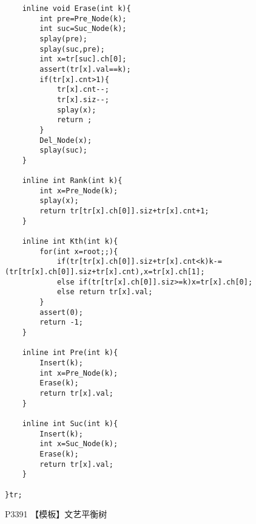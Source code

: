 \documentclass{ctexart}
\begin{document}
\begin{lstlisting}
	inline void Erase(int k){
		int pre=Pre_Node(k);
		int suc=Suc_Node(k);
		splay(pre);
		splay(suc,pre);
		int x=tr[suc].ch[0];
		assert(tr[x].val==k);
		if(tr[x].cnt>1){
			tr[x].cnt--;
			tr[x].siz--;
			splay(x);
			return ;
		}
		Del_Node(x);
		splay(suc);
	}
	
	inline int Rank(int k){
		int x=Pre_Node(k);
		splay(x);
		return tr[tr[x].ch[0]].siz+tr[x].cnt+1;
	}
	
	inline int Kth(int k){
		for(int x=root;;){
			if(tr[tr[x].ch[0]].siz+tr[x].cnt<k)k-=(tr[tr[x].ch[0]].siz+tr[x].cnt),x=tr[x].ch[1];
			else if(tr[tr[x].ch[0]].siz>=k)x=tr[x].ch[0];
			else return tr[x].val;
		}
		assert(0);
		return -1;
	}
	
	inline int Pre(int k){
		Insert(k);
		int x=Pre_Node(k);
		Erase(k);
		return tr[x].val;
	}
	
	inline int Suc(int k){
		Insert(k);
		int x=Suc_Node(k);
		Erase(k);
		return tr[x].val;
	}
	
}tr;
\end{lstlisting}
P3391 【模板】文艺平衡树
\end{document}
